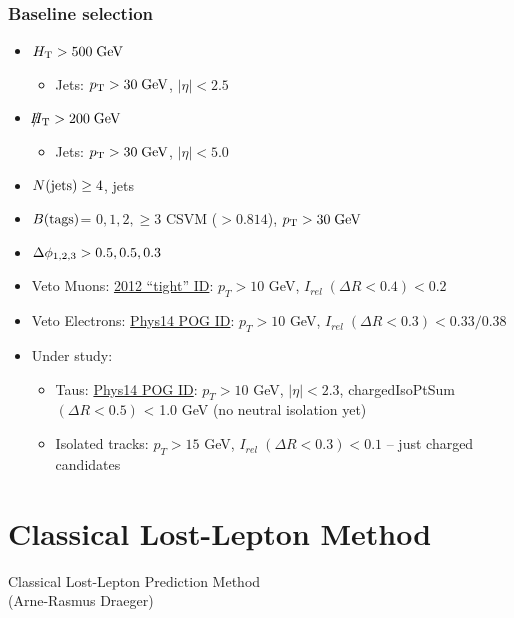 \documentclass{beamer}
\begin{document}
\begin{frame}
\frametitle{Baseline selection}
\normalsize
\begin{itemize}
 \item $H_{\text{T}} >500 \;\text{Ge}\kern-0.06667em\text{V}$
 \begin{itemize}
       \item Jets: $p_{\text{T}}>30\;\text{Ge}\kern-0.06667em\text{V}$, $|\eta|<2.5$
      \end{itemize}
 \item $\slash\mkern-12mu{H}_{\text{T}} >200 \;\text{Ge}\kern-0.06667em\text{V}$
  \begin{itemize}
       \item Jets: $p_{\text{T}}>30\;\text{Ge}\kern-0.06667em\text{V}$, $|\eta|<5.0$
      \end{itemize}
 \item $N(\text{jets})\ge 4$, \HT jets
 \item $B(\text{tags})$= {$0,1,2,\geq3$} CSVM ($>0.814$), $p_{\text{T}}>30\;\text{Ge}\kern-0.06667em\text{V}$
 \item $\Delta\phi_{1,2,3}>0.5,0.5,0.3$
\item Veto Muons: \href{https://twiki.cern.ch/twiki/bin/view/CMSPublic/SWGuideMuonId\#Tight\_Muon}{2012 ``tight'' ID}: $p_T > 10$ GeV, $I_{rel}\; (\Delta R<0.4) < 0.2$    
    \item Veto Electrons: \href{https://twiki.cern.ch/twiki/bin/viewauth/CMS/CutBasedElectronIdentificationRun2\#CSA14\_selection\_conditions\_25ns}{Phys14 POG ID}:  $p_T > 10$ GeV, $I_{rel}\;
      (\Delta R<0.3) < 0.33 / 0.38$
      \item Under study:
      \begin{itemize}


    \item Taus: \href{https://indico.cern.ch/event/359233/contribution/4/material/slides/0.pdf}{Phys14 POG ID}: $p_T > 10$ GeV, $|\eta| < 2.3$,
      chargedIsoPtSum $(\Delta R<0.5)$ < 1.0 GeV (no neutral isolation yet)
    \item Isolated tracks: $p_T > 15$ GeV, $I_{rel}\;(\Delta R<0.3) < 0.1$ -- just charged candidates
      \end{itemize}
\end{itemize}
\end{frame}

\section{Classical Lost-Lepton Method}
\begin{frame}
  \begin{center}
    {\Large
     Classical Lost-Lepton Prediction Method \\(Arne-Rasmus Draeger)}
  \end{center}
\end{frame}
\end{document}
